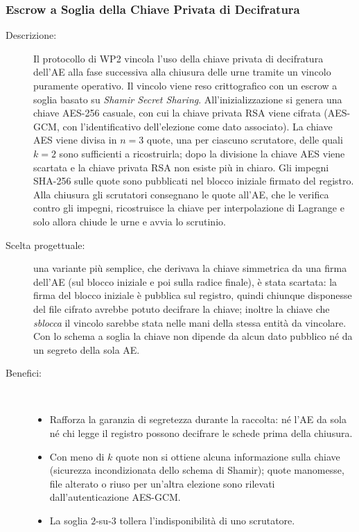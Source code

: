 \documentclass[12pt,a4paper]{article}
\begin{document}
\subsubsection{Escrow a Soglia della Chiave Privata di Decifratura}
\label{sec:mod33}

\begin{description}
  \item[Descrizione:] Il protocollo di WP2 vincola l'uso della chiave privata di decifratura dell'AE alla fase successiva alla chiusura delle urne tramite un vincolo puramente operativo. Il vincolo viene reso crittografico con un escrow a soglia basato su \textit{Shamir Secret Sharing}. All'inizializzazione si genera una chiave AES-256 casuale, con cui la chiave privata RSA viene cifrata (AES-GCM, con l'identificativo dell'elezione come dato associato). La chiave AES viene divisa in $n=3$ quote, una per ciascuno scrutatore, delle quali $k=2$ sono sufficienti a ricostruirla; dopo la divisione la chiave AES viene scartata e la chiave privata RSA non esiste più in chiaro. Gli impegni SHA-256 sulle quote sono pubblicati nel blocco iniziale firmato del registro. Alla chiusura gli scrutatori consegnano le quote all'AE, che le verifica contro gli impegni, ricostruisce la chiave per interpolazione di Lagrange e solo allora chiude le urne e avvia lo scrutinio.
  \item[Scelta progettuale:] una variante più semplice, che derivava la chiave simmetrica da una firma dell'AE (sul blocco iniziale e poi sulla radice finale), è stata scartata: la firma del blocco iniziale è pubblica sul registro, quindi chiunque disponesse del file cifrato avrebbe potuto decifrare la chiave; inoltre la chiave che \emph{sblocca} il vincolo sarebbe stata nelle mani della stessa entità da vincolare. Con lo schema a soglia la chiave non dipende da alcun dato pubblico né da un segreto della sola AE.
  \item[Benefici:] \
    \begin{itemize}
      \item Rafforza la garanzia di segretezza durante la raccolta: né l'AE da sola né chi legge il registro possono decifrare le schede prima della chiusura.
      \item Con meno di $k$ quote non si ottiene alcuna informazione sulla chiave (sicurezza incondizionata dello schema di Shamir); quote manomesse, file alterato o riuso per un'altra elezione sono rilevati dall'autenticazione AES-GCM.
      \item La soglia $2$-su-$3$ tollera l'indisponibilità di uno scrutatore.

\end{itemize}
\end{description}
\end{document}
